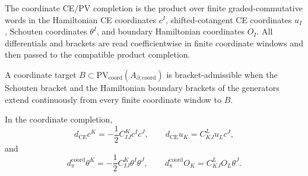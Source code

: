 \documentclass[11pt]{memoir}
\begin{document}
\begin{defn}\label{defn:formal-disk-ce-pv-completion}
  The coordinate CE/PV completion is the product over finite
  graded-commutative words in the Hamiltonian CE coordinates \(c^I\),
  shifted-cotangent CE coordinates \(u_I\), Schouten coordinates
  \(\theta^I\), and boundary Hamiltonian coordinates \(O_I\).  All
  differentials and brackets are read coefficientwise in finite coordinate
  windows and then passed to the compatible product completion.
\end{defn}

\begin{defn}\label{defn:bracket-kernel-admissible}
  A coordinate target \(B\subset
  \mathrm{PV}_{\mathrm{coord}}(A_{\partial,\mathrm{coord}})\) is
  bracket-admissible when the Schouten bracket and the Hamiltonian
  boundary brackets of the generators extend continuously from every
  finite coordinate window to \(B\).
\end{defn}

\begin{lem}\label{lem:formal-disk-ce-schouten-continuity}
  In the coordinate completion,
  \[
    d_{\mathrm{CE}}c^K=-\frac12 C^K_{IJ}c^Ic^J,\qquad
    d_{\mathrm{CE}}u_K=C^L_{KJ}u_Lc^J,
  \]
  and
  \[
    d_\pi^{\mathrm{coord}}\theta^K
      =-\frac12 C^K_{IJ}\theta^I\theta^J,\qquad
    d_\pi^{\mathrm{coord}}O_K=C^L_{KJ}O_L\theta^J .
  \]
\end{lem}
\end{document}
